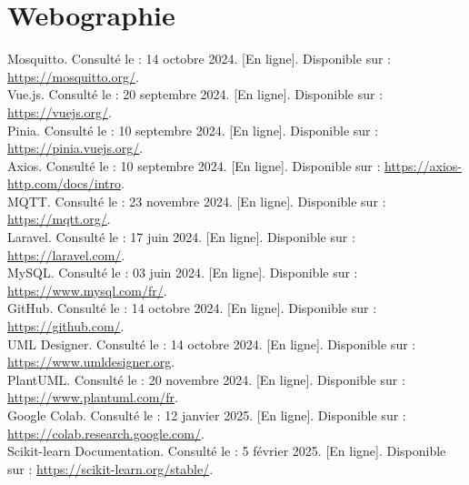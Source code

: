 \chapter*{Webographie}

\noindent [19] Mosquitto. Consulté le : 14 octobre 2024. [En ligne]. Disponible sur : \url{https://mosquitto.org/}.\\

\noindent [20] Vue.js. Consulté le : 20 septembre 2024. [En ligne]. Disponible sur : \url{https://vuejs.org/}.\\

\noindent [21] Pinia. Consulté le : 10 septembre 2024. [En ligne]. Disponible sur : \url{https://pinia.vuejs.org/}.\\

\noindent [22] Axios. Consulté le : 10 septembre 2024. [En ligne]. Disponible sur : \url{https://axios-http.com/docs/intro}.\\

\noindent [23] MQTT. Consulté le : 23 novembre 2024. [En ligne]. Disponible sur : \url{https://mqtt.org/}.\\

\noindent [24] Laravel. Consulté le : 17 juin 2024. [En ligne]. Disponible sur : \url{https://laravel.com/}.\\

\noindent [25] MySQL. Consulté le : 03 juin 2024. [En ligne]. Disponible sur : \url{https://www.mysql.com/fr/}.\\

\noindent [26] GitHub. Consulté le : 14 octobre 2024. [En ligne]. Disponible sur : \url{https://github.com/}.\\

\noindent [27] UML Designer. Consulté le : 14 octobre 2024. [En ligne]. Disponible sur : \url{https://www.umldesigner.org}.\\

\noindent [28] PlantUML. Consulté le : 20 novembre 2024. [En ligne]. Disponible sur : \url{https://www.plantuml.com/fr}.\\

\noindent [29] Google Colab. Consulté le : 12 janvier 2025. [En ligne]. Disponible sur : \url{https://colab.research.google.com/}.\\

\noindent [30] Scikit-learn Documentation. Consulté le : 5 février 2025. [En ligne]. Disponible sur : \url{https://scikit-learn.org/stable/}.\\

